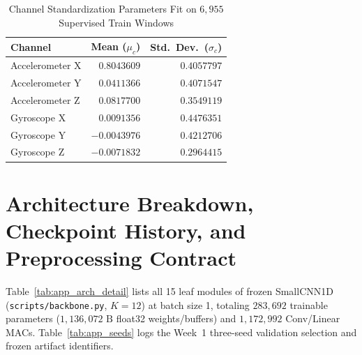 \documentclass[11pt,oneside,a4paper]{report}
\newcommand{\code}[1]{{\small\upshape\ttfamily #1}}
\theoremstyle{remark}
\begin{document}
\begin{table}[htbp]
\centering\small
\caption{Channel Standardization Parameters Fit on $6,955$ Supervised Train Windows}
\label{tab:app_norm}
\begin{tabularx}{\textwidth}{@{}Yrr@{}}
\toprule
\textbf{Channel} & \textbf{Mean ($\mu_c$)} & \textbf{Std.\ Dev.\ ($\sigma_c$)} \\
\midrule
Accelerometer X & $0.8043609$ & $0.4057797$ \\
Accelerometer Y & $0.0411366$ & $0.4071547$ \\
Accelerometer Z & $0.0817700$ & $0.3549119$ \\
Gyroscope X & $0.0091356$ & $0.4476351$ \\
Gyroscope Y & $-0.0043976$ & $0.4212706$ \\
Gyroscope Z & $-0.0071832$ & $0.2964415$ \\
\bottomrule
\end{tabularx}
\end{table}

\chapter{Architecture Breakdown, Checkpoint History, and Preprocessing Contract}
\label{app:arch}

Table~\ref{tab:app_arch_detail} lists all 15 leaf modules of frozen \code{SmallCNN1D} (\nolinkurl{scripts/backbone.py}, $K=12$) at batch size 1, totaling $283,692$ trainable parameters ($1,136,072\text{ B}$ \code{float32} weights/buffers) and $1,172,992$ Conv/Linear MACs. Table~\ref{tab:app_seeds} logs the Week~1 three-seed validation selection and frozen artifact identifiers.
\end{document}
